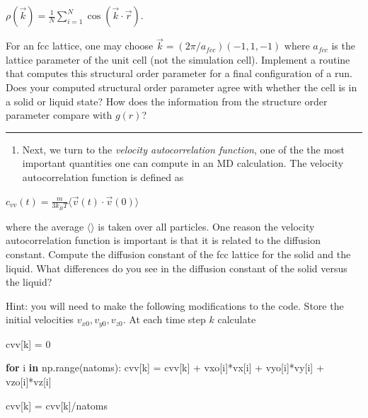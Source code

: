 \documentclass[11pt]{article}
\providecommand{\tightlist}{%
      \setlength{\itemsep}{0pt}\setlength{\parskip}{0pt}}
\newenvironment{Shaded}{}{}
\newcommand{\KeywordTok}[1]{\textcolor[rgb]{0.00,0.44,0.13}{\textbf{{#1}}}}
\newcommand{\DecValTok}[1]{\textcolor[rgb]{0.25,0.63,0.44}{{#1}}}
\newcommand{\NormalTok}[1]{{#1}}
\newcommand{\ControlFlowTok}[1]{\textcolor[rgb]{0.00,0.44,0.13}{\textbf{{#1}}}}
\newcommand{\OperatorTok}[1]{\textcolor[rgb]{0.40,0.40,0.40}{{#1}}}
\newcommand{\BuiltInTok}[1]{{#1}}
\begin{document}
\(\rho(\vec{k}) = \frac{1}{N}\sum_{i=1}^N \cos(\vec{k}\cdot\vec{r})\).

For an fcc lattice, one may choose \(\vec{k} = (2\pi/a_{fcc})(-1,1,-1)\)
where \(a_{fcc}\) is the lattice parameter of the unit cell (not the
simulation cell). Implement a routine that computes this structural
order parameter for a final configuration of a run. Does your computed
structural order parameter agree with whether the cell is in a solid or
liquid state? How does the information from the structure order
parameter compare with \(g(r)\)?

\begin{center}\rule{0.5\linewidth}{0.5pt}\end{center}

    \begin{enumerate}
\def\labelenumi{\arabic{enumi}.}
\setcounter{enumi}{11}
\tightlist
\item
  Next, we turn to the \emph{velocity autocorrelation function}, one of
  the the most important quantities one can compute in an MD
  calculation. The velocity autocorrelation function is defined as
\end{enumerate}

\(c_{vv}(t) = \frac{m}{3k_B T}\langle \vec{v}(t) \cdot \vec{v}(0) \rangle\)

where the average \(\langle \rangle\) is taken over all particles. One
reason the velocity autocorrelation function is important is that it is
related to the diffusion constant. Compute the diffusion constant of the
fcc lattice for the solid and the liquid. What differences do you see in
the diffusion constant of the solid versus the liquid?

Hint: you will need to make the following modifications to the code.
Store the initial velocities \(v_{x0}, v_{y0}, v_{z0}\). At each time
step \(k\) calculate

\begin{Shaded}
\begin{Highlighting}[]
\NormalTok{cvv[k] }\OperatorTok{=} \DecValTok{0}

\ControlFlowTok{for}\NormalTok{ i }\KeywordTok{in}\NormalTok{ np.}\BuiltInTok{range}\NormalTok{(natoms):}
\NormalTok{    cvv[k] }\OperatorTok{=}\NormalTok{ cvv[k] }\OperatorTok{+}\NormalTok{ vxo[i]}\OperatorTok{*}\NormalTok{vx[i] }\OperatorTok{+}\NormalTok{ vyo[i]}\OperatorTok{*}\NormalTok{vy[i] }\OperatorTok{+}\NormalTok{ vzo[i]}\OperatorTok{*}\NormalTok{vz[i]}

\NormalTok{cvv[k] }\OperatorTok{=}\NormalTok{ cvv[k]}\OperatorTok{/}\NormalTok{natoms}
\end{Highlighting}
\end{Shaded}
\end{document}
